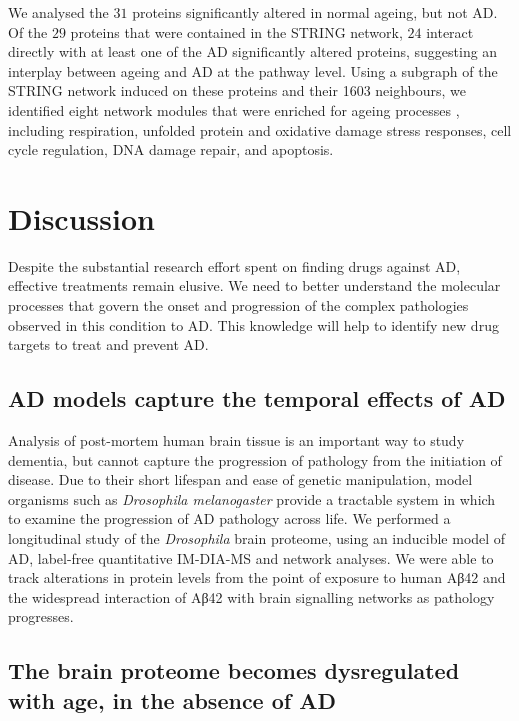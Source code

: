 We analysed the $31$ proteins significantly altered in normal ageing,
but not AD.
Of the $29$ proteins that were contained in the STRING network,
$24$ interact directly with at least one of the AD significantly altered proteins,
suggesting an interplay between ageing and AD at the pathway level.
Using a subgraph of the STRING network induced on these proteins and their \num{1603} neighbours,
we identified eight network modules
that were enriched for
ageing processes \cite{Lopez-Otin2013}, including respiration, unfolded protein and
oxidative damage stress responses, cell cycle regulation, DNA damage repair, and apoptosis.

\section{Discussion}
\label{discussion}

Despite the substantial research effort spent on finding drugs against AD,
effective treatments remain elusive.
We need to better understand the molecular processes that govern the onset and progression
of the complex pathologies observed in this condition to AD.
This knowledge will help to identify new drug targets to treat and prevent AD.

\subsection{AD models capture the temporal effects of AD}

Analysis of post-mortem human brain tissue is an important way to study dementia,
but cannot capture the progression of pathology from the initiation of disease.
Due to their short lifespan and ease of genetic manipulation, model organisms
such as \textit{Drosophila melanogaster} provide a tractable system in which to examine the
progression of AD pathology across life.
We performed a longitudinal study of the \textit{Drosophila} brain proteome,
using an inducible model of AD, label-free quantitative IM-DIA-MS and network analyses.
We were able to track alterations in protein levels from the point of exposure to human
Aβ42 and the widespread interaction of Aβ42 with brain signalling networks as
pathology progresses.

\subsection{The brain proteome becomes dysregulated with age, in the absence of AD}

